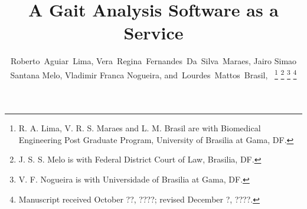 \documentclass[journal]{IEEEtran}
\begin{document}
%
\title{A Gait Analysis Software as a Service}
%
%
%

\author{
	Roberto~Aguiar~Lima,
	Vera~Regina~Fernandes~Da~Silva~Maraes,
	Jairo Simao Santana Melo,
	Vladimir Franca Nogueira,
        and~Lourdes~Mattos~Brasil,~
	\thanks{R. A. Lima, V. R. S. Maraes and L. M. Brasil are with Biomedical Engineering Post Graduate Program, University of Brasilia at Gama, DF.}
	\thanks{J. S. S. Melo is with Federal District Court of Law, Brasilia, DF.}
	\thanks{V. F. Nogueira is with Universidade of Brasilia at Gama, DF.}
	\thanks{Manuscript received October ??, ????; revised December ?, ????.}
}


% 
%
\end{document}
